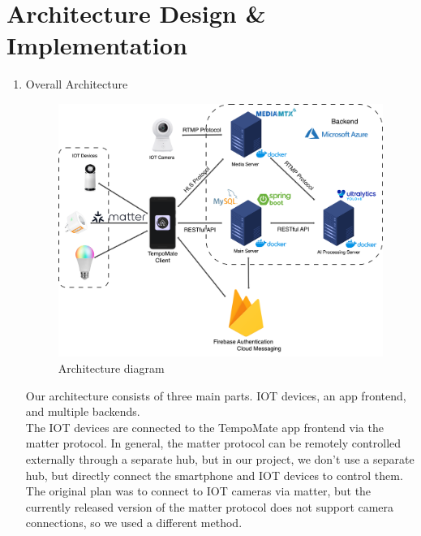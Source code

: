 \newcommand{\addImage}[2]{
  \begin{figure}[!htb]
    \begin{center}
      \texttt{[image: \#1]}
      \caption{#2} %
      \renewcommand{\thefigure}{\thesubsection.\arabic{figure}}
    \end{center}
  \end{figure}
}

\newpage
\section{\Large{Architecture Design \& Implementation}}

\begin{enumerate}[label=\arabic*]
  \item {\large{Overall Architecture}}\\
    \begin{figure}[!ht]
        \begin{center}
            \includegraphics[width=14cm]{imgs/final_architecture.png}
            \caption{Architecture diagram} %
            \renewcommand{\thefigure}{\thesubsection.\arabic{figure}}
        \end{center}
    \end{figure}
    Our architecture consists of three main parts. IOT devices, an app frontend, and multiple backends.\\
    
    The IOT devices are connected to the TempoMate app frontend via the matter protocol. In general, the matter protocol can be remotely controlled externally through a separate hub, but in our project, we don't use a separate hub, but directly connect the smartphone and IOT devices to control them. The original plan was to connect to IOT cameras via matter, but the currently released version of the matter protocol does not support camera connections, so we used a different method.\\
     

\end{enumerate}
